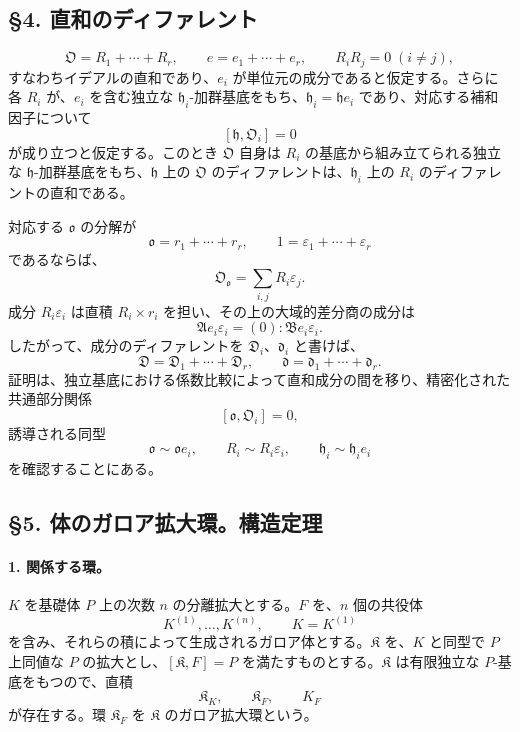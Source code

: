 \subsection*{§4. 直和のディファレント}

\[
        \mathfrak O=R_1+\cdots+R_r,
        \qquad
        e=e_1+\cdots+e_r,
        \qquad
        R_iR_j=0\;(i\ne j),
\]
すなわちイデアルの直和であり、\(e_i\) が単位元の成分であると仮定する。さらに各 \(R_i\) が、\(e_i\) を含む独立な \(\mathfrak h_i\)-加群基底をもち、\(\mathfrak h_i=\mathfrak h e_i\) であり、対応する補和因子について
\[
        [\mathfrak h,\mathfrak O_i]=0
\]
が成り立つと仮定する。このとき \(\mathfrak O\) 自身は \(R_i\) の基底から組み立てられる独立な \(\mathfrak h\)-加群基底をもち、\(\mathfrak h\) 上の \(\mathfrak O\) のディファレントは、\(\mathfrak h_i\) 上の \(R_i\) のディファレントの直和である。

対応する \(\mathfrak o\) の分解が
\[
        \mathfrak o=r_1+
        \cdots+r_r,
        \qquad
        1=\varepsilon_1+
        \cdots+\varepsilon_r
\]
であるならば、
\[
        \mathfrak O_{\mathfrak o}=\sum_{i,j}R_i\varepsilon_j.
\]
成分 \(R_i\varepsilon_i\) は直積 \(R_i\times r_i\) を担い、その上の大域的差分商の成分は
\[
        \mathfrak A e_i\varepsilon_i=(0):\mathfrak B e_i\varepsilon_i.
\]
したがって、成分のディファレントを \(\mathfrak D_i\)、\(\mathfrak d_i\) と書けば、
\[
        \mathfrak D=\mathfrak D_1+
        \cdots+\mathfrak D_r,
        \qquad
        \mathfrak d=\mathfrak d_1+
        \cdots+\mathfrak d_r.
\]
証明は、独立基底における係数比較によって直和成分の間を移り、精密化された共通部分関係
\[
        [\mathfrak o,\mathfrak O_i]=0,
\]
誘導される同型
\[
        \mathfrak o\sim\mathfrak o e_i,
        \qquad
        R_i\sim R_i\varepsilon_i,
        \qquad
        \mathfrak h_i\sim \mathfrak h_i e_i
\]
を確認することにある。

\subsection*{§5. 体のガロア拡大環。構造定理}

\paragraph{1. 関係する環。}
\(K\) を基礎体 \(P\) 上の次数 \(n\) の分離拡大とする。\(F\) を、\(n\) 個の共役体
\[
        K^{(1)},\ldots,K^{(n)},
        \qquad K=K^{(1)}
\]
を含み、それらの積によって生成されるガロア体とする。\(\mathfrak K\) を、\(K\) と同型で \(P\) 上同値な \(P\) の拡大とし、\([\mathfrak K,F]=P\) を満たすものとする。\(\mathfrak K\) は有限独立な \(P\)-基底をもつので、直積
\[
        \mathfrak K_K,
        \qquad \mathfrak K_F,
        \qquad K_F
\]
が存在する。環 \(\mathfrak K_F\) を \(\mathfrak K\) のガロア拡大環という。

